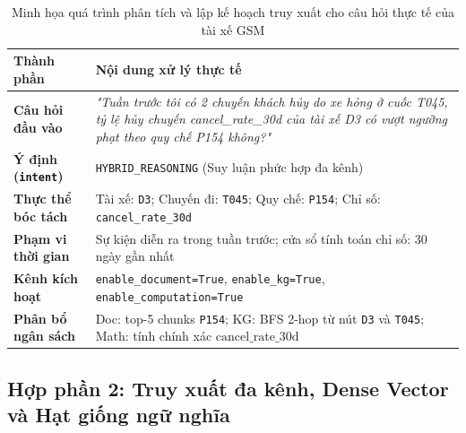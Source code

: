 \documentclass[a4paper,11pt]{article}
\begin{document}
\begin{table}[htbp]
\centering
\footnotesize
\caption{Minh họa quá trình phân tích và lập kế hoạch truy xuất cho câu hỏi thực tế của tài xế GSM}
\label{tab:query-example}
\vspace{0.15cm}
\begin{tabularx}{\textwidth}{l>{\raggedright\arraybackslash}X}
\toprule
\textbf{Thành phần} & \textbf{Nội dung xử lý thực tế} \\
\midrule
\textbf{Câu hỏi đầu vào} & \textit{"Tuần trước tôi có 2 chuyến khách hủy do xe hỏng ở cuốc T045, tỷ lệ hủy chuyến cancel\_rate\_30d của tài xế D3 có vượt ngưỡng phạt theo quy chế P154 không?"} \\
\textbf{Ý định (\texttt{intent})} & \texttt{HYBRID\_REASONING} (Suy luận phức hợp đa kênh) \\
\textbf{Thực thể bóc tách} & Tài xế: \texttt{D3}; Chuyến đi: \texttt{T045}; Quy chế: \texttt{P154}; Chỉ số: \texttt{cancel\_rate\_30d} \\
\textbf{Phạm vi thời gian} & Sự kiện diễn ra trong tuần trước; cửa sổ tính toán chỉ số: 30 ngày gần nhất \\
\textbf{Kênh kích hoạt} & \texttt{enable\_document=True}, \texttt{enable\_kg=True}, \texttt{enable\_computation=True} \\
\textbf{Phân bổ ngân sách} & Doc: top-5 chunks \texttt{P154}; KG: BFS 2-hop từ nút \texttt{D3} và \texttt{T045}; Math: tính chính xác $\text{cancel\_rate\_30d}$ \\
\bottomrule
\end{tabularx}
\end{table}

\subsection{Hợp phần 2: Truy xuất đa kênh, Dense Vector và Hạt giống ngữ nghĩa}
\label{sec:dense-retrieval}
\end{document}
